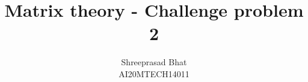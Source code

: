 \documentclass[journal,12pt,twocolumn]{IEEEtran}
\begin{document}
\makeatletter
{}
\makeatother
\let\StandardTheFigure\thefigure
\let\vec\mathbf
\renewcommand{\thefigure}{\theproblem}
\def\putbox#1#2#3{\makebox[0in][l]{\makebox[#1][l]{}\raisebox{\baselineskip}[0in][0in]{\raisebox{#2}[0in][0in]{#3}}}}
     \def\rightbox#1{\makebox[0in][r]{#1}}
     \def\centbox#1{\makebox[0in]{#1}}
     \def\topbox#1{\raisebox{-\baselineskip}[0in][0in]{#1}}
     \def\midbox#1{\raisebox{-0.5\baselineskip}[0in][0in]{#1}}
\vspace{3cm}
\title{Matrix theory - Challenge problem 2}
\author{Shreeprasad Bhat\\AI20MTECH14011}
%
%
%
% 
%
\end{document}
